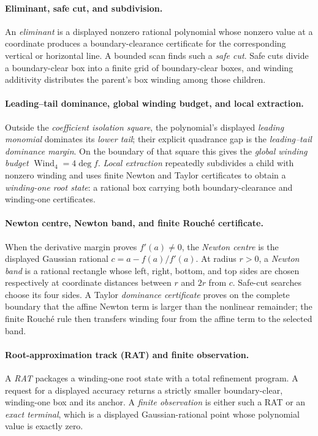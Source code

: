 \documentclass[11pt]{article}
\newcommand{\Wind}{\operatorname{Wind}}
\begin{document}
\paragraph{Eliminant, safe cut, and subdivision.}
An \emph{eliminant} is a displayed nonzero rational polynomial whose nonzero
value at a coordinate produces a boundary-clearance certificate for the
corresponding vertical or horizontal line.  A bounded scan finds such a
\emph{safe cut}.  Safe cuts divide a boundary-clear box into a finite grid of
boundary-clear boxes, and winding additivity distributes the parent's box
winding among those children.

\paragraph{Leading--tail dominance, global winding budget, and local
extraction.}
Outside the \emph{coefficient isolation square}, the polynomial's displayed
\emph{leading monomial} dominates its \emph{lower tail}; their explicit
quadrance gap is the \emph{leading--tail dominance margin}.  On the boundary
of that square this gives the \emph{global winding budget}
$\Wind_4=4\deg f$.  \emph{Local extraction} repeatedly subdivides a child
with nonzero winding and uses finite Newton and Taylor certificates to obtain
a \emph{winding-one root state}: a rational box carrying both
boundary-clearance and winding-one certificates.

\paragraph{Newton centre, Newton band, and finite Rouch\'e certificate.}
When the derivative margin proves $f'(a)\ne0$, the \emph{Newton centre} is
the displayed Gaussian rational $c=a-f(a)/f'(a)$.  At radius $r>0$, a
\emph{Newton band} is a rational rectangle whose left, right, bottom, and top
sides are chosen respectively at coordinate distances between $r$ and $2r$
from $c$.  Safe-cut searches choose its four sides.  A Taylor
\emph{dominance certificate} proves on the complete boundary that the affine
Newton term is larger than the nonlinear remainder; the finite Rouch\'e rule
then transfers winding four from the affine term to the selected band.

\paragraph{Root-approximation track (RAT) and finite observation.}
A \emph{RAT} packages a winding-one root state with a total refinement
program.  A request for a displayed accuracy returns a strictly smaller
boundary-clear, winding-one box and its anchor.  A \emph{finite observation}
is either such a RAT or an \emph{exact terminal}, which is a displayed
Gaussian-rational point whose polynomial value is exactly zero.
\end{document}
